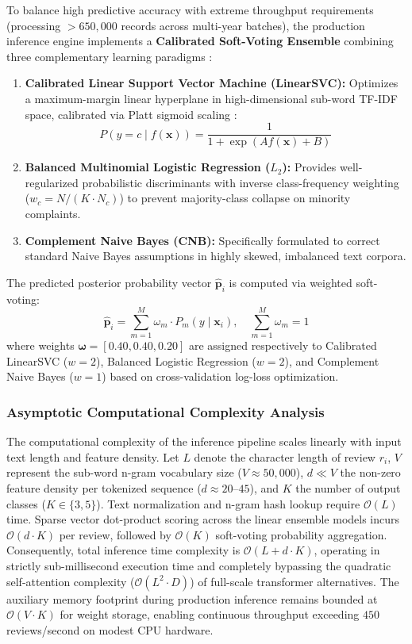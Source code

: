 \documentclass[review,12pt,authoryear]{elsarticle}
\begin{document}
To balance high predictive accuracy with extreme throughput requirements (processing $>650,000$ records across multi-year batches), the production inference engine implements a \textbf{Calibrated Soft-Voting Ensemble} combining three complementary learning paradigms \citep{kuncheva2004combining}:
\begin{enumerate}
    \item \textbf{Calibrated Linear Support Vector Machine (LinearSVC):} Optimizes a maximum-margin linear hyperplane in high-dimensional sub-word TF-IDF space, calibrated via Platt sigmoid scaling \citep{niculescu2005predicting}:
    \begin{equation}
    P(y = c \mid f(\mathbf{x})) = \frac{1}{1 + \exp(A f(\mathbf{x}) + B)}
    \end{equation}
    \item \textbf{Balanced Multinomial Logistic Regression ($L_2$):} Provides well-regularized probabilistic discriminants with inverse class-frequency weighting ($w_c = N / (K \cdot N_c)$) to prevent majority-class collapse on minority complaints.
    \item \textbf{Complement Naive Bayes (CNB):} Specifically formulated to correct standard Naive Bayes assumptions in highly skewed, imbalanced text corpora.
\end{enumerate}

The predicted posterior probability vector $\hat{\mathbf{p}}_i$ is computed via weighted soft-voting:
\begin{equation}
\hat{\mathbf{p}}_i = \sum_{m=1}^M \omega_m \cdot P_m(y \mid \mathbf{x}_i), \quad \sum_{m=1}^M \omega_m = 1
\end{equation}
where weights $\boldsymbol{\omega} = [0.40, 0.40, 0.20]$ are assigned respectively to Calibrated LinearSVC ($w=2$), Balanced Logistic Regression ($w=2$), and Complement Naive Bayes ($w=1$) based on cross-validation log-loss optimization.

\subsubsection{Asymptotic Computational Complexity Analysis}
The computational complexity of the inference pipeline scales linearly with input text length and feature density. Let $L$ denote the character length of review $r_i$, $V$ represent the sub-word n-gram vocabulary size ($V \approx 50{,}000$), $d \ll V$ the non-zero feature density per tokenized sequence ($d \approx 20\text{--}45$), and $K$ the number of output classes ($K \in \{3, 5\}$). Text normalization and n-gram hash lookup require $\mathcal{O}(L)$ time. Sparse vector dot-product scoring across the linear ensemble models incurs $\mathcal{O}(d \cdot K)$ per review, followed by $\mathcal{O}(K)$ soft-voting probability aggregation. Consequently, total inference time complexity is $\mathcal{O}(L + d \cdot K)$, operating in strictly sub-millisecond execution time and completely bypassing the quadratic self-attention complexity ($\mathcal{O}(L^2 \cdot D)$) of full-scale transformer alternatives. The auxiliary memory footprint during production inference remains bounded at $\mathcal{O}(V \cdot K)$ for weight storage, enabling continuous throughput exceeding $450$ reviews/second on modest CPU hardware.
\end{document}
